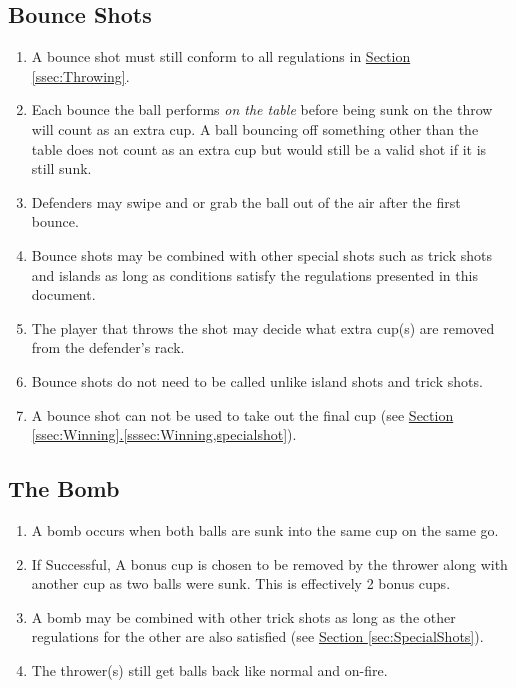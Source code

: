 	\subsection{Bounce Shots}\label{ssec:BounceShots}
		\begin{enumerate}[label=(\roman*), ref=\roman*]
            \item \label{sssec:BounceShots,rules} A bounce shot must still conform to all regulations in \hyperref[ssec:Throwing]{Section \ref*{ssec:Throwing}}.
            \item \label{sssec:BounceShots,multibounce} Each bounce the ball performs \textit{on the table} before being sunk on the throw will count as an extra cup.
                A ball bouncing off something other than the table does not count as an extra cup but would still be a valid shot if it is still sunk.
            \item \label{sssec:BounceShots,swipegrab} Defenders may swipe and or grab the ball out of the air after the first bounce.
            \item \label{sssec:BounceShots,combo} Bounce shots may be combined with other special shots such as trick shots and islands as long as conditions satisfy the regulations presented in this document.
            \item \label{sssec:BounceShots,removedcups} The player that throws the shot may decide what extra cup(s) are removed from the defender's rack.
            \item \label{sssec:BounceShots,calling} Bounce shots do not need to be called unlike island shots and trick shots.
            \item \label{sssec:BounceShots,winning} A bounce shot can not be used to take out the final cup
                (see \hyperref[sssec:Winning,specialshot]{Section \ref*{ssec:Winning}.\ref*{sssec:Winning,specialshot}}).
    \end{enumerate}
	\subsection{The Bomb}\label{ssec:Bomb}
        \begin{enumerate}[label=(\roman*), ref=\roman*]
            \item \label{sssec:Bomb,condition} A bomb occurs when both balls are sunk into the same cup on the same go. 
            \item \label{sssec:Bomb,success} If Successful, A bonus cup is chosen to be removed by the thrower along with another cup as two balls were sunk.
                This is effectively 2 bonus cups.
            \item \label{sssec:Bomb,combo} A bomb may be combined with other trick shots as long as the other regulations for the other are also satisfied
                (see \hyperref[sec:SpecialShots]{Section \ref*{sec:SpecialShots}}).
            \item \label{sssec:Bomb,ballback} The thrower(s) still get balls back like normal and on-fire.
        \end{enumerate}
